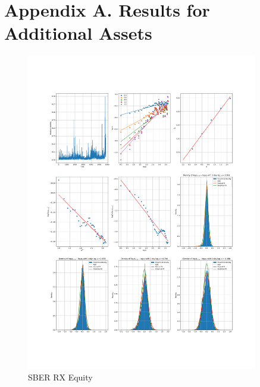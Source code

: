 \clearpage

\section*{Appendix A. Results for Additional Assets}
    \noindent
    \begin{figure}[h]
        \includegraphics[width=0.9\textwidth]{fig/SBER RX Equity.pdf}
        \caption{SBER RX Equity}
    \end{figure}

